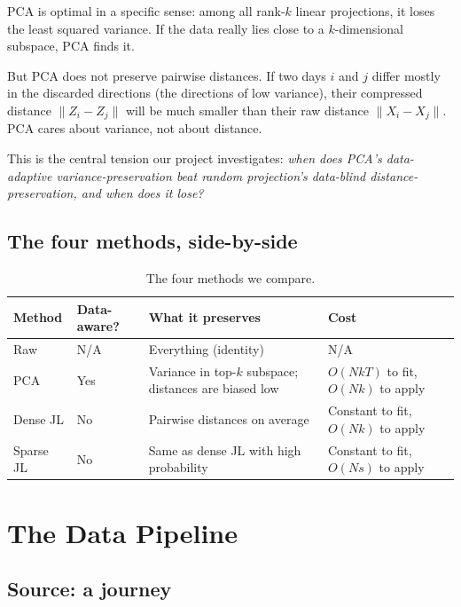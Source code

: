 \documentclass[11pt]{article}
\begin{document}
PCA is optimal in a specific sense: among all rank-$k$ linear projections, it loses the least squared variance. If the data really lies close to a $k$-dimensional subspace, PCA finds it.

But PCA does not preserve pairwise distances. If two days $i$ and $j$ differ mostly in the discarded directions (the directions of low variance), their compressed distance $\|Z_i - Z_j\|$ will be much smaller than their raw distance $\|X_i - X_j\|$. PCA cares about variance, not about distance.

This is the central tension our project investigates: \emph{when does PCA's data-adaptive variance-preservation beat random projection's data-blind distance-preservation, and when does it lose?}

\subsection{The four methods, side-by-side}

\begin{table}[H]
\centering
\caption{The four methods we compare.}
\begin{tabular}{p{2cm} p{2.5cm} p{4cm} p{4cm}}
\toprule
\textbf{Method} & \textbf{Data-aware?} & \textbf{What it preserves} & \textbf{Cost} \\
\midrule
Raw & N/A & Everything (identity) & N/A \\
PCA & Yes & Variance in top-$k$ subspace; distances are biased low & $O(N k T)$ to fit, $O(N k)$ to apply \\
Dense JL & No & Pairwise distances on average & Constant to fit, $O(N k)$ to apply \\
Sparse JL & No & Same as dense JL with high probability & Constant to fit, $O(N s)$ to apply \\
\bottomrule
\end{tabular}
\end{table}

\newpage

\section{The Data Pipeline}

\subsection{Source: a journey}
\end{document}
